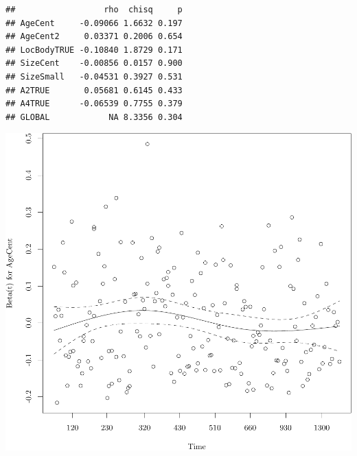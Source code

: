 \documentclass{article}
\begin{document}
\begin{knitrout}
\color{fgcolor}\begin{kframe}
\begin{alltt}
 \hlkwb{=} \hlstd{(} \hlopt{~}  \hlopt{+}  \hlopt{+}  \hlopt{+}  \hlopt{+}  \hlopt{+}  \hlopt{+}  \hlopt{+}   
\end{alltt}
\begin{verbatim}
##                  rho  chisq     p
## AgeCent     -0.09066 1.6632 0.197
## AgeCent2     0.03371 0.2006 0.654
## LocBodyTRUE -0.10840 1.8729 0.171
## SizeCent    -0.00856 0.0157 0.900
## SizeSmall   -0.04531 0.3927 0.531
## A2TRUE       0.05681 0.6145 0.433
## A4TRUE      -0.06539 0.7755 0.379
## GLOBAL            NA 8.3356 0.304
\end{verbatim}
\begin{alltt}
\hlstd{(}
\end{alltt}
\end{kframe}

{\centering \includegraphics[width=\maxwidth]{figure/05-eda-ph-check-full-3-1} 

}





\end{knitrout}
\end{document}
